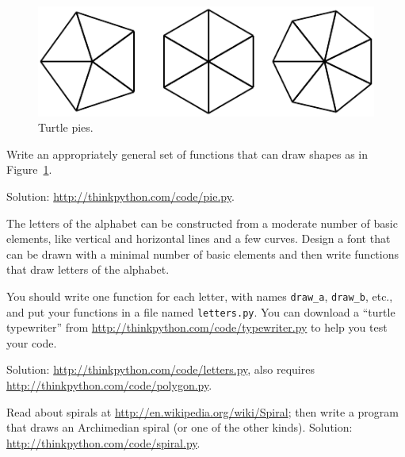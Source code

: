 \documentclass[10pt]{book}
\begin{document}
\begin{CJK}{UTF8}{gbsn}
\begin{figure}
\centerline
{\includegraphics[scale=0.8]{figs/pies.pdf}}
\caption{Turtle pies.}
\label{fig.pies}
\end{figure}


\begin{exercise}

Write an appropriately general set of functions that
can draw shapes as in Figure~\ref{fig.pies}.

Solution: \url{http://thinkpython.com/code/pie.py}.

\end{exercise}

\begin{exercise}

The letters of the alphabet can be constructed from a moderate number
of basic elements, like vertical and horizontal lines and a few
curves.  Design a font that can be drawn with a minimal number of
basic elements and then write functions that draw letters of the
alphabet.

You should write one function for each letter, with names
\verb"draw_a", \verb"draw_b", etc., and put your functions
in a file named {\tt letters.py}.  You can download a
``turtle typewriter'' from \url{http://thinkpython.com/code/typewriter.py}
to help you test your code.

Solution: \url{http://thinkpython.com/code/letters.py}, also requires
\url{http://thinkpython.com/code/polygon.py}.

\end{exercise}

\begin{exercise}

Read about spirals at \url{http://en.wikipedia.org/wiki/Spiral}; then
write a program that draws an Archimedian spiral (or one of the other
kinds).  Solution: \url{http://thinkpython.com/code/spiral.py}.

\end{exercise}



\end{CJK}
\end{document}
